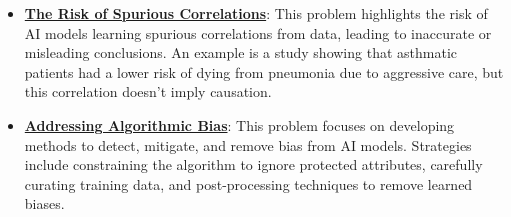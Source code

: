 \documentclass{article}%
\begin{document}
\begin{itemize}[leftmargin=*]
\item \href{https://purdue.brightspace.com/d2l/common/assets/pdfjs-d2l-dist/1.0.14-legacy/web/viewer.html?file=\%2Fcontent\%2Fenforced\%2F1095467-wl.202510.CS.24300.001\%2F16L2-ethics.pdf\%3Fou\%3D1095467\&lang=en-us\&container=d2l-fileviewer-rendered-pdf\&fullscreen=d2l-fileviewer-rendered-pdf-dialog\&height=667#page=33}{\textbf{The Risk of Spurious Correlations}}: This problem highlights the risk of AI models learning spurious correlations from data, leading to inaccurate or misleading conclusions. An example is a study showing that asthmatic patients had a lower risk of dying from pneumonia due to aggressive care, but this correlation doesn't imply causation.%
\item \href{https://purdue.brightspace.com/d2l/common/assets/pdfjs-d2l-dist/1.0.14-legacy/web/viewer.html?file=\%2Fcontent\%2Fenforced\%2F1095467-wl.202510.CS.24300.001\%2F16L2-ethics.pdf\%3Fou\%3D1095467\&lang=en-us\&container=d2l-fileviewer-rendered-pdf\&fullscreen=d2l-fileviewer-rendered-pdf-dialog\&height=667#page=24}{\textbf{Addressing Algorithmic Bias}}: This problem focuses on developing methods to detect, mitigate, and remove bias from AI models. Strategies include constraining the algorithm to ignore protected attributes, carefully curating training data, and post-processing techniques to remove learned biases.%
\end{itemize}

%
\end{document}
